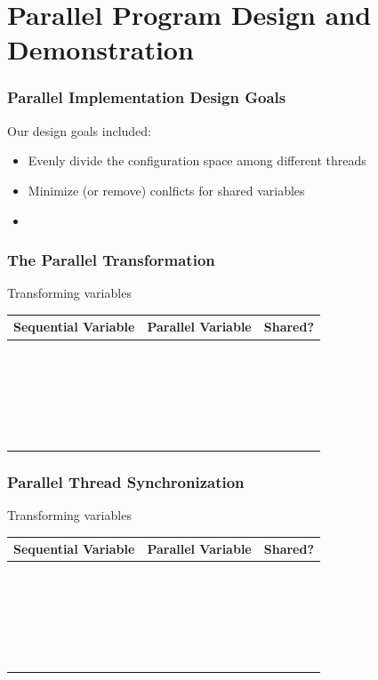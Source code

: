\documentclass[handout]{beamer}
\begin{document}
\section{Parallel Program Design and Demonstration}
\begin{frame}
	\frametitle{Parallel Implementation Design Goals}
	Our design goals included:
	\begin{itemize}
		\item Evenly divide the configuration space among different threads
		\item Minimize (or remove) conlficts for shared variables
	\end{itemize}

	\medskip

	\begin{itemize}
		\item 
	\end{itemize}
\end{frame}

\begin{frame}
	\frametitle{The Parallel Transformation}
	Transforming variables 
\begin{table}
	\begin{tabular}{c | c | c}
	Sequential Variable & Parallel Variable & Shared? \\ \hline
	~ & ~ & ~ \\
	~ & ~ & ~ \\
	~ & ~ & ~ \\
	~ & ~ & ~ \\
	~ & ~ & ~ \\
	\end{tabular}
\end{table}
\end{frame}

\begin{frame}
	\frametitle{Parallel Thread Synchronization}
	Transforming variables 
\begin{table}
	\begin{tabular}{c | c | c}
	Sequential Variable & Parallel Variable & Shared? \\ \hline
	~ & ~ & ~ \\
	~ & ~ & ~ \\
	~ & ~ & ~ \\
	~ & ~ & ~ \\
	~ & ~ & ~ \\
	\end{tabular}
\end{table}
\end{frame}
\end{document}
